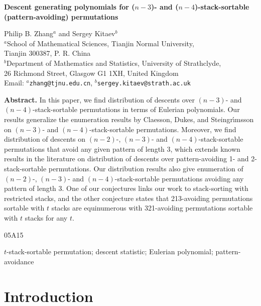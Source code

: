 \documentclass[11pt]{article}
\newcommand{\+}{\mbox{\ensuremath{\scriptstyle{+}}}}
\begin{document}
\begin{center}
	{\large \bf  Descent generating polynomials for ($n-3$)- and ($n-4$)-stack-sortable (pattern-avoiding) permutations}
\end{center}


\begin{center}
	Philip B. Zhang$^{a}$ and Sergey Kitaev$^{b}$
	\\[6pt]
	
	$^{a}$School of Mathematical Sciences, Tianjin Normal University,\\
	Tianjin 300387, P. R. China\\[6pt]
	
	$^{b}$Department of Mathematics and Statistics, University of Strathclyde,\\
	26 Richmond Street, Glasgow G1 1XH, United Kingdom\\[6pt]
	
	Email: $^{a}${\tt zhang@tjnu.edu.cn},
	$^{b}${\tt sergey.kitaev@strath.ac.uk}
\end{center}


\noindent\textbf{Abstract.}
In this paper, we find distribution of descents over $(n-3)$- and $(n-4)$-stack-sortable permutations in terms of Eulerian polynomials. Our results generalize the enumeration results by Claesson, Dukes, and Steingr\'{\i}msson  on $(n-3)$- and $(n-4)$-stack-sortable permutations. Moreover, we find distribution of descents on $(n-2)$-, $(n-3)$- and $(n-4)$-stack-sortable permutations that avoid any given pattern of length 3, which extends known results in the literature on distribution of descents over pattern-avoiding 1- and 2-stack-sortable permutations. Our distribution results also give enumeration of $(n-2)$-, $(n-3)$- and $(n-4)$-stack-sortable permutations avoiding any pattern of length 3. One of our conjectures links our work to stack-sorting with restricted stacks, and the other conjecture states that 213-avoiding permutations sortable with $t$ stacks are equinumerous with 321-avoiding permutations sortable with $t$ stacks for any $t$.

 05A15

  $t$-stack-sortable permutation; descent statistic; Eulerian polynomial; pattern-avoidance

\section{Introduction}
\end{document}
